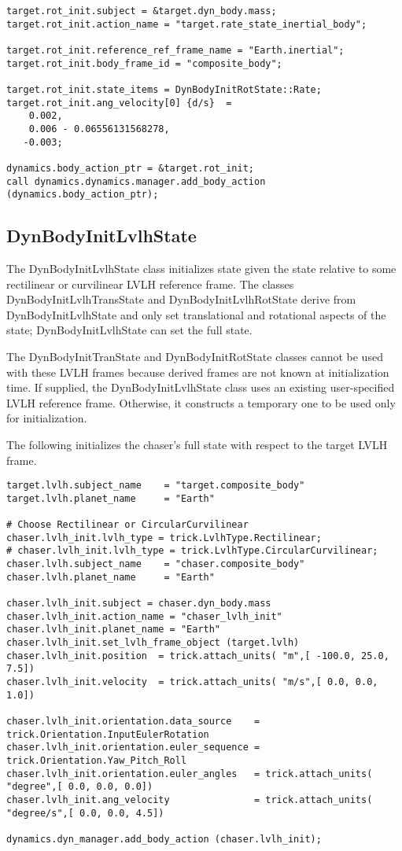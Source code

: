 \begin{verbatim}
target.rot_init.subject = &target.dyn_body.mass;
target.rot_init.action_name = "target.rate_state_inertial_body";

target.rot_init.reference_ref_frame_name = "Earth.inertial";
target.rot_init.body_frame_id = "composite_body";

target.rot_init.state_items = DynBodyInitRotState::Rate;
target.rot_init.ang_velocity[0] {d/s}  =
    0.002,
    0.006 - 0.06556131568278,
   -0.003;

dynamics.body_action_ptr = &target.rot_init;
call dynamics.dynamics.manager.add_body_action (dynamics.body_action_ptr);
\end{verbatim}


\subsection{DynBodyInitLvlhState}
The DynBodyInitLvlhState class initializes state
given the state relative to some rectilinear or curvilinear LVLH
reference frame. The classes DynBodyInitLvlhTransState and
DynBodyInitLvlhRotState derive from DynBodyInitLvlhState and only set
translational and rotational aspects of the state; DynBodyInitLvlhState
can set the full state.

The DynBodyInitTranState and DynBodyInitRotState classes cannot
be used with these LVLH frames because derived frames
are not known at initialization time. If supplied, the DynBodyInitLvlhState class
uses an existing user-specified LVLH reference frame. Otherwise, it constructs
a temporary one to be used only for initialization.

The following initializes the chaser's full state with respect to the
target LVLH frame.

\begin{verbatim}
target.lvlh.subject_name    = "target.composite_body"
target.lvlh.planet_name     = "Earth"

# Choose Rectilinear or CircularCurvilinear
chaser.lvlh_init.lvlh_type = trick.LvlhType.Rectilinear;
# chaser.lvlh_init.lvlh_type = trick.LvlhType.CircularCurvilinear;
chaser.lvlh.subject_name    = "chaser.composite_body"
chaser.lvlh.planet_name     = "Earth"

chaser.lvlh_init.subject = chaser.dyn_body.mass
chaser.lvlh_init.action_name = "chaser_lvlh_init"
chaser.lvlh_init.planet_name = "Earth"
chaser.lvlh_init.set_lvlh_frame_object (target.lvlh)
chaser.lvlh_init.position  = trick.attach_units( "m",[ -100.0, 25.0, 7.5])
chaser.lvlh_init.velocity  = trick.attach_units( "m/s",[ 0.0, 0.0, 1.0])

chaser.lvlh_init.orientation.data_source    = trick.Orientation.InputEulerRotation
chaser.lvlh_init.orientation.euler_sequence = trick.Orientation.Yaw_Pitch_Roll
chaser.lvlh_init.orientation.euler_angles   = trick.attach_units( "degree",[ 0.0, 0.0, 0.0])
chaser.lvlh_init.ang_velocity               = trick.attach_units( "degree/s",[ 0.0, 0.0, 4.5])

dynamics.dyn_manager.add_body_action (chaser.lvlh_init);
\end{verbatim}


